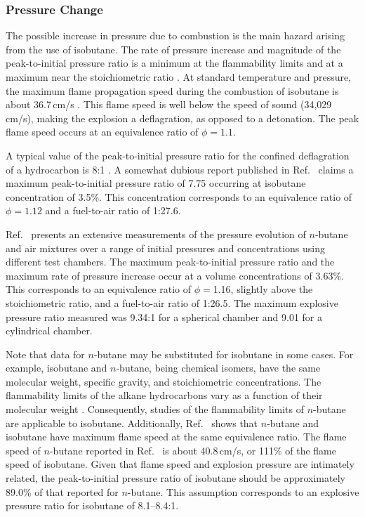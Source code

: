\subsubsection{Pressure Change}
The possible increase in pressure due to combustion is the main hazard arising from the use of isobutane.  The rate of pressure increase and magnitude of the peak-to-initial pressure ratio is a minimum at the flammability limits and at a maximum near the stoichiometric ratio \cite{Zabetakis_1965}.
At standard temperature and pressure, the maximum flame propagation speed during the combustion of isobutane is about 36.7\,cm/s \cite{Davis_1998}.  This flame speed is well below the speed of sound (34,029\,cm/s), making the explosion a deflagration, as opposed to a detonation.  The peak flame speed occurs at an equivalence ratio of $\phi=1.1$.

A typical value of the peak-to-initial pressure ratio for the confined deflagration of a hydrocarbon is 8:1 \cite{Zabetakis_1965}. 
A somewhat dubious report published in Ref.~\cite{Zgliczynski_1994} claims a maximum peak-to-initial pressure ratio of 7.75 occurring at isobutane concentration of 3.5\%.  This concentration corresponds to an equivalence ratio of $\phi=1.12$ and a fuel-to-air ratio of 1:27.6.

Ref.~\cite{Razus_2007} presents an extensive measurements of the pressure evolution of $n$-butane and air mixtures over a range of initial pressures and concentrations using different test chambers.  The maximum peak-to-initial pressure ratio and the maximum rate of pressure increase occur at a volume concentrations of 3.63\%.  This corresponds to an equivalence ratio of $\phi=$1.16, slightly above the stoichiometric ratio, and a fuel-to-air ratio of 1:26.5.  The maximum explosive pressure ratio measured was 9.34:1 for a spherical chamber and 9.01 for a cylindrical chamber.

Note that data for $n$-butane may be substituted  for isobutane in some cases.  For example, isobutane and $n$-butane, being chemical isomers, have the same molecular weight, specific gravity, and stoichiometric concentrations.
The flammability limits of the alkane hydrocarbons vary as a function of their molecular weight \cite{Zabetakis_1965}.  Consequently, studies of the flammability limits of $n$-butane are applicable to isobutane.  Additionally, Ref.~\cite{Davis_1998} shows that $n$-butane and isobutane have maximum flame speed at the same equivalence ratio.  The flame speed of $n$-butane reported in Ref.~\cite{Davis_1998} is about 40.8\,cm/s, or 111\% of the flame speed of isobutane.  Given that flame speed and explosion pressure are intimately related, the peak-to-initial pressure ratio of isobutane should be approximately 89.0\% of that reported for $n$-butane.  This assumption corresponds to an explosive pressure ratio for isobutane of 8.1--8.4:1.

